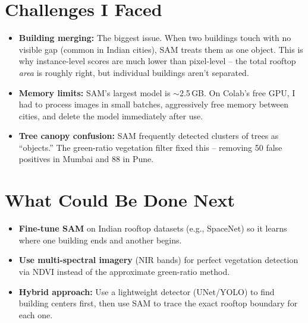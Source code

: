 \documentclass[9pt, a4paper]{article}
\begin{document}
\section*{Challenges I Faced}

\begin{itemize}[nosep, leftmargin=1.2em]
    \item \textbf{Building merging:} The biggest issue. When two buildings touch with no visible gap (common in Indian cities), SAM treats them as one object. This is why instance-level scores are much lower than pixel-level -- the total rooftop \textit{area} is roughly right, but individual buildings aren't separated.
    \item \textbf{Memory limits:} SAM's largest model is $\sim$2.5\,GB. On Colab's free GPU, I had to process images in small batches, aggressively free memory between cities, and delete the model immediately after use.
    \item \textbf{Tree canopy confusion:} SAM frequently detected clusters of trees as ``objects.'' The green-ratio vegetation filter fixed this -- removing 50 false positives in Mumbai and 88 in Pune.
\end{itemize}

\section*{What Could Be Done Next}

\begin{itemize}[nosep, leftmargin=1.2em]
    \item \textbf{Fine-tune SAM} on Indian rooftop datasets (e.g., SpaceNet) so it learns where one building ends and another begins.
    \item \textbf{Use multi-spectral imagery} (NIR bands) for perfect vegetation detection via NDVI instead of the approximate green-ratio method.
    \item \textbf{Hybrid approach:} Use a lightweight detector (UNet/YOLO) to find building centers first, then use SAM to trace the exact rooftop boundary for each one.
\end{itemize}
\end{document}
